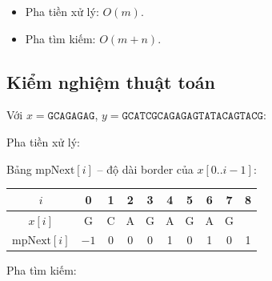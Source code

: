 \documentclass[12pt,twoside,openright]{extreport}
\begin{document}
\begin{itemize}
	\item Pha tiền xử lý: $O(m)$.
	\item Pha tìm kiếm: $O(m + n)$.
\end{itemize}

\subsection{Kiểm nghiệm thuật toán}

Với $x = \texttt{GCAGAGAG}$, $y = \texttt{GCATCGCAGAGAGTATACAGTACG}$:

Pha tiền xử lý:

Bảng $\text{mpNext}[i]$ -- độ dài border của $x[0..i-1]$:

\begin{center}
\begin{tabular}{|c|c|c|c|c|c|c|c|c|c|}
\hline
$i$ & 0 & 1 & 2 & 3 & 4 & 5 & 6 & 7 & 8 \\
\hline
$x[i]$ & G & C & A & G & A & G & A & G & \\
\hline
$\text{mpNext}[i]$ & $-1$ & 0 & 0 & 0 & 1 & 0 & 1 & 0 & 1 \\
\hline
\end{tabular}
\end{center}

Pha tìm kiếm:
\end{document}
